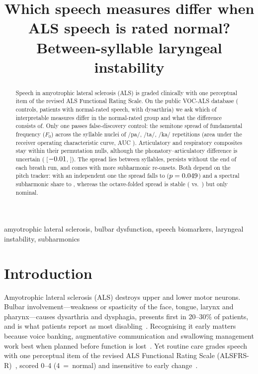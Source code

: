 \documentclass{article}
\title{Which speech measures differ when ALS speech is rated normal?\\ Between-syllable laryngeal instability}
\begin{document}
\maketitle

\begin{abstract}
Speech in amyotrophic lateral sclerosis (ALS) is graded clinically with one perceptual item of the revised ALS Functional Rating Scale. On the public VOC-ALS database (\nHC{} controls, \nND{} patients with normal-rated speech, \nD{} with dysarthria) we ask which of \nFeat{} interpretable measures differ in the normal-rated group and what the difference consists of. Only one passes false-discovery control: the semitone spread of fundamental frequency ($F_0$) across the syllable nuclei of /pa/, /ta/, /ka/ repetitions (area under the receiver operating characteristic curve, AUC \topAUC). Articulatory and respiratory composites stay within their permutation nulls, although the phonatory--articulatory difference is uncertain (\dPhonArtDiff{} [$-0.01$, \dPhonArtHi]). The spread lies between syllables, persists without the end of each breath run, and comes with more subharmonic re-onsets. Both depend on the pitch tracker: with an independent one the spread falls to \trkRpr{} ($p=0.049$) and a spectral subharmonic share to \rSubhRprAUC, whereas the octave-folded spread is stable (\rFoldAUC{} vs.\ \trkFoldRpr) but only nominal.
\end{abstract}

\begin{keywords}
amyotrophic lateral sclerosis, bulbar dysfunction, speech biomarkers, laryngeal instability, subharmonics
\end{keywords}

\section{Introduction}
\label{sec:intro}
Amyotrophic lateral sclerosis (ALS) destroys upper and lower motor neurons. Bulbar involvement---weakness or spasticity of the face, tongue, larynx and pharynx---causes dysarthria and dysphagia, presents first in 20--30\% of patients, and is what patients report as most disabling~\cite{feldman2022als,tomik2010dysarthria}. Recognising it early matters because voice banking, augmentative communication and swallowing management work best when planned before function is lost~\cite{green2013bulbar}. Yet routine care grades speech with one perceptual item of the revised ALS Functional Rating Scale (ALSFRS-R)~\cite{cedarbaum1999alsfrsr}, scored 0--4 (4~=~normal) and insensitive to early change~\cite{green2013bulbar,allison2017diagnostic}.
\end{document}

